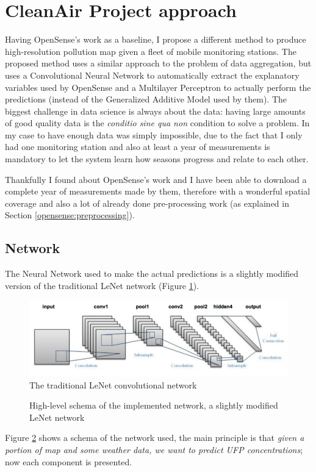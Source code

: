 \documentclass[11pt,a4paper,titlepage]{book}
\begin{document}
\section{CleanAir Project approach}
\label{cleanair:goals}
Having OpenSense's work as a baseline, I propose a different method to produce high-resolution pollution map given a fleet of mobile monitoring stations.
\newline
\newline
The proposed method uses a similar approach to the problem of data aggregation, but uses a Convolutional Neural Network to automatically extract the explanatory variables used by OpenSense and a Multilayer Perceptron to actually perform the predictions (instead of the Generalized Additive Model used by them).
\newline
\newline
The biggest challenge in data science is always about the data: having large amounts of good quality data is the \textit{conditio sine qua non} condition to solve a problem. In my case to have enough data was simply impossible, due to the fact that I only had one monitoring station and also at least a year of measurements is mandatory to let the system learn how seasons progress and relate to each other.

Thankfully I found about OpenSense's work and I have been able to download a complete year of measurements made by them, therefore with a wonderful spatial coverage and also a lot of already done pre-processing work (as explained in Section \ref{opensense:preprocessing}). 

\subsection{Network}
\label{cleanair:cnn_schema}
The Neural Network used to make the actual predictions is a slightly modified version of the traditional LeNet network (Figure \ref{lenet_schema}). 
\begin{figure}[ht]
    \centering
    \includegraphics[width=\textwidth]{imgs/ch_2/LeNet_schema.png}
    \caption{The traditional LeNet convolutional network} 
    \label{lenet_schema}
\end{figure}
\begin{figure}[ht]
    \centering
    
    \caption{High-level schema of the implemented network, a slightly modified LeNet network} 
    \label{cleanair_cnn_schema}
\end{figure}
\newline
\newline
Figure \ref{cleanair_cnn_schema} shows a schema of the network used, the main principle is that \textit{given a portion of map and some weather data, we want to predict UFP concentrations}; now each component is presented.
\end{document}
